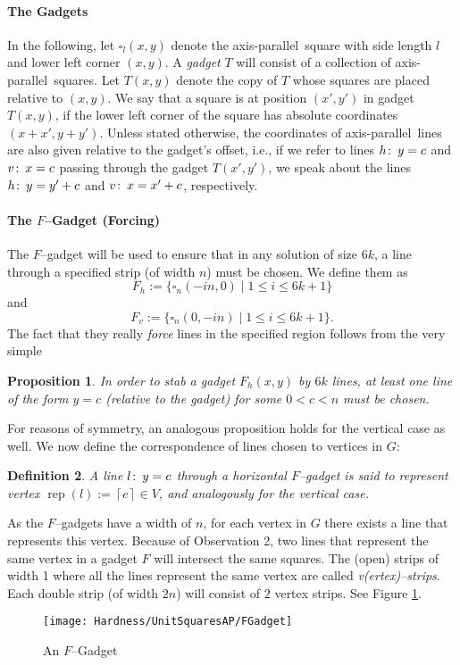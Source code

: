 \documentclass[12pt]{article}
\newtheorem{definition}{Definition}
\newtheorem{proposition}[definition]{Proposition}
\newcommand{\co}{\colon\thinspace}
\newcommand{\ap}{a.p.\ }
\renewcommand{\ap}{axis-parallel\ }
\newcommand{\rep}{\operatorname{rep}}
\newcommand{\rup}[1]{ \left\lceil  #1 \right\rceil}
\begin{document}
\paragraph{The Gadgets} In the following, let $\square_l(x,y)$ denote the \ap square with side length $l$ and lower left corner $(x, y)$. A \textit{gadget} $T$ will consist of a collection of \ap squares. Let $T(x, y)$ denote the copy of $T$ whose squares are placed relative to $(x, y)$. We say that a square is at position $(x', y')$ in gadget $T(x, y)$, if the lower left corner of the square has absolute coordinates $(x + x', y + y')$. Unless stated otherwise, the coordinates of \ap lines are also given relative to the gadget's offset, i.e., if we refer to lines $h\co y = c$ and $v\co x = c$ passing through the gadget $T(x', y')$, we speak about the lines $h\co y = y' + c$ and $v\co x = x' + c$, respectively.

\paragraph{The $F$--Gadget (Forcing)}
The $F$--gadget will be used to ensure that in any solution of size $6k$, a line through a specified strip (of width $n$) must be chosen. We define them as
\[ F_h := \{\square_n(-in, 0) \mid 1 \leq i \leq 6k + 1 \} \]
and 
\[ F_v := \{\square_n(0, -in) \mid 1 \leq i \leq 6k + 1 \}. \]
The fact that they really \textit{force} lines in the specified region follows from the very simple
\begin{proposition}\label{Lemma:Forcing} In order to stab a gadget $F_h(x, y)$ by $6k$ lines, at least one line of the form $y = c$ (relative to the gadget) for some $0 < c < n$ must be chosen.
\end{proposition}
For reasons of symmetry, an analogous proposition holds for the vertical case as well.
We now define the correspondence of lines chosen to vertices in $G$:
\begin{definition} A line $l\co y = c$ through a horizontal $F$--gadget is said to \textit{represent} vertex $\rep(l) := \rup{c} \in V$, and analogously for the vertical case.
\end{definition}
As the $F$--gadgets have a width of $n$, for each vertex in $G$ there exists a line that represents this vertex. Because of Observation 2, two lines that represent the same vertex in a gadget $F$ will intersect the same squares. The (open) strips of width 1 where all the lines represent the same vertex are called \textit{v(ertex)--strips}. Each double strip (of width $2n$) will consist of $2$ vertex strips. See Figure \ref{fig:FGadget}.
\begin{figure}
	\centering
		\texttt{[image: Hardness/UnitSquaresAP/FGadget]}
	\caption{An $F$--Gadget}
	\label{fig:FGadget}
\end{figure}
\end{document}
